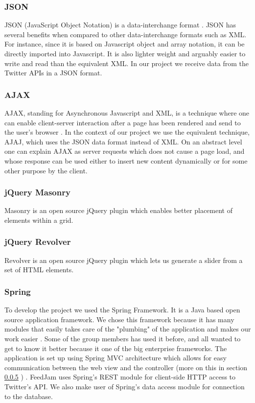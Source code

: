 \subsubsection{JSON}
JSON (JavaScript Object Notation) is a data-interchange format \cite{Crockford2011}. JSON has several benefits when compared to other data-interchange formats such as XML. For instance, since it is based on Javascript object and array notation, it can be directly imported into Javascript. It is also lighter weight and arguably easier to write and read than the equivalent XML. In our project we receive data from the Twitter APIs in a JSON format.

\subsubsection{AJAX}%
AJAX, standing for Asynchronous Javascript and XML, is a technique where one can enable client-server interaction after a page has been rendered and send to the user's browser \cite{Garrett2005}. In the context of our project we use the equivalent technique, AJAJ, which uses the JSON data format instead of XML. On an abstract level one can explain AJAX as server requests which does not cause a page load, and whose response can be used either to insert new content dynamically or for some other purpose by the client.

\subsubsection{jQuery Masonry}
Masonry is an open source jQuery plugin which enables better placement of elements within a grid.

\subsubsection{jQuery Revolver}
Revolver is an open source jQuery plugin which lets us generate a slider from a set of HTML elements.


\subsubsection{Spring} %
To develop the project we used the Spring Framework. It is a Java based open source application framework. We chose this framework because it has many modules that easily takes care of the "plumbing" of the application and makes our work easier \citep{SpringSourcec}. Some of the group members has used it before, and all wanted to get to know it better because it one of the big enterprise frameworks. The application is set up using Spring MVC architecture which allows for easy communication between the web view and the controller (more on this in section \ref{} \nameref{}) \citep{SpringSourcee}. FeedJam uses Spring's REST module for client-side HTTP access to Twitter's API. We also make user of Spring's data access module for connection to the database.